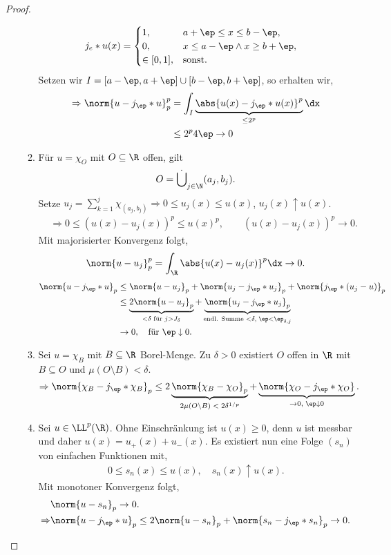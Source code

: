 \begin{proof}
\begin{enumerate}[label=\arabic{*}.)]
\begin{enumerate}[label=\alph{*})]
\begin{align*}
&j_e*u(x) = \begin{cases}
1, & a+\ep \le x \le b-\ep,\\
0, & x\le a-\ep \land x\ge b+\ep,\\
\in[0,1], & \text{sonst}. 
\end{cases}
\end{align*}
Setzen wir $I=[a-\ep,a+\ep]\cup[b-\ep,b+\ep]$, so erhalten wir,
\begin{align*}
\Rightarrow \norm{u-j_\ep*u}_p^p &=
\int_I
\underbrace{\abs{u(x)-j_\ep*u(x)}^p}_{\le 2^p}\dx \\
&\le 2^p 4\ep \to 0
\end{align*}
\item Für $u=\chi_O$ mit $O\subseteq\R$ offen, gilt
\begin{align*}
O = \dot{\bigcup}_{j\in\N} (a_j,b_j).
\end{align*}
Setze $u_j = \sum\limits_{k=1}^j \chi_{(a_j,b_j)} \Rightarrow 0\le u_j(x) \le
u(x)$, $u_j(x)\uparrow u(x)$.
\begin{align*}
&\Rightarrow 0 \le (u(x)-u_j(x))^p \le u(x)^p,\qquad (u(x)-u_j(x))^p \to 0.
\end{align*}
Mit majorisierter Konvergenz folgt,
\begin{align*}
\norm{u-u_j}_p^p = \int_\R \abs{u(x)-u_j(x)}^p\dx \to 0.
\end{align*}
\begin{align*}
\norm{u-j_\ep*u}_p
&\le \norm{u-u_j}_p + \norm{u_j-j_\ep*u_j}_p + \norm{j_\ep*(u_j-u)}_p\\
&\le \underbrace{2\norm{u-u_j}_p}_{<\delta \text{ für }j>J_\delta} + 
\underbrace{\norm{u_j - j_\ep * u_j}_p}_{\small\text{endl. Summe } <\delta,\;
\ep<\ep_{\delta,j}}  \\
&\to 0,\quad\text{für }\ep\downarrow0.
\end{align*}
\item Sei $u=\chi_B$ mit $B\subseteq\R$ Borel-Menge. Zu $\delta > 0$ existiert
$O$ offen in $\R$ mit $B\subseteq O$ und $\mu(O\setminus B)<\delta$.
\begin{align*}
\Rightarrow \norm{\chi_B - j_\ep*\chi_B}_p \le
2\underbrace{\norm{\chi_B-\chi_O}_p}_{2\mu(O\setminus B)\;<\;2\delta^{1/p}} +
\underbrace{\norm{\chi_O-j_\ep*\chi_O}}_{\to 0,\;\ep\downarrow 0}.
\end{align*}
\item Sei $u\in\LL^p(\R)$. Ohne Einschränkung ist $u(x)\ge 0$, denn $u$ ist
messbar und daher $u(x) = u_+(x) + u_-(x)$. Es existiert nun eine Folge $(s_n)$
von einfachen Funktionen mit,
\begin{align*}
0\le s_n(x)\le u(x),\quad s_n(x)\uparrow u(x).
\end{align*}
Mit monotoner Konvergenz folgt,
\begin{align*}
&\norm{u-s_n}_p \to 0.\\
\Rightarrow&
\norm{u-j_\ep*u}_p \le 2\norm{u-s_n}_p + \norm{s_n-j_\ep*s_n}_p \to 0.\qedhere
\end{align*}
\end{enumerate}
\end{enumerate}
\end{proof}

